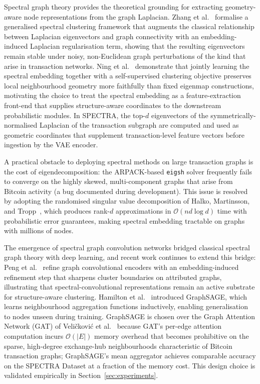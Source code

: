 \documentclass[journal]{IEEEtran}
\newcommand{\spectra}{\textsc{SPECTRA}}
\begin{document}
Spectral graph theory provides the theoretical grounding for extracting
geometry-aware node representations from the graph Laplacian.  Zhang et
al.~\cite{Zhang2024} formalise a generalised spectral clustering framework that
augments the classical relationship between Laplacian eigenvectors and graph
connectivity with an embedding-induced Laplacian regularisation term, showing
that the resulting eigenvectors remain stable under noisy, non-Euclidean graph
perturbations of the kind that arise in transaction networks.  Ning et
al.~\cite{Ning2023} demonstrate that jointly learning the spectral embedding
together with a self-supervised clustering objective preserves local
neighbourhood geometry more faithfully than fixed eigenmap constructions,
motivating the choice to treat the spectral embedding as a feature-extraction
front-end that supplies structure-aware coordinates to the downstream
probabilistic modules.  In \spectra{}, the top-$d$ eigenvectors
of the symmetrically-normalised Laplacian of the transaction subgraph are
computed and used as geometric coordinates that supplement transaction-level
feature vectors before ingestion by the VAE encoder.

A practical obstacle to deploying spectral methods on large transaction graphs
is the cost of eigendecomposition: the ARPACK-based \texttt{eigsh} solver
frequently fails to converge on the highly skewed, multi-component graphs that
arise from Bitcoin activity (a bug documented during development).  This issue
is resolved by adopting the randomised singular value decomposition of Halko, Martinsson,
and Tropp~\cite{Halko2011}, which produces rank-$d$ approximations in
$\mathcal{O}(n d \log d)$ time with probabilistic error guarantees, making
spectral embedding tractable on graphs with millions of nodes.

The emergence of spectral graph convolution networks bridged classical spectral
graph theory with deep learning, and recent work continues to extend this
bridge: Peng et al.~\cite{Peng2023} refine graph convolutional encoders with an
embedding-induced refinement step that sharpens cluster boundaries on
attributed graphs, illustrating that spectral-convolutional representations
remain an active substrate for structure-aware clustering.
Hamilton et al.~\cite{Hamilton2017} introduced
GraphSAGE, which learns neighbourhood aggregation functions inductively,
enabling generalisation to nodes unseen during training.  GraphSAGE is chosen
over the Graph Attention Network (GAT) of Veli\v{c}kovi\'{c} et
al.~\cite{Velickovic2018} because GAT's per-edge attention computation incurs
$\mathcal{O}(|E|)$ memory overhead that becomes prohibitive on the sparse,
high-degree exchange-hub neighbourhoods characteristic of Bitcoin transaction
graphs; GraphSAGE's mean aggregator achieves comparable accuracy on the
SPECTRA Dataset at a fraction of the memory cost.  This design choice is
validated empirically
in Section~\ref{sec:experiments}.
\end{document}
